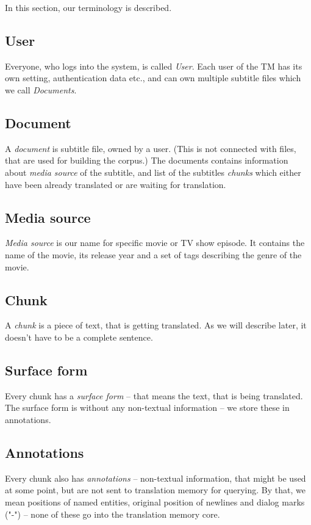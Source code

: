 \label{sec:glossary}

In this section, our terminology is described.

\subsection*{User}
Everyone, who logs into the system, is called \emph{User}. Each user of the TM has its own setting, authentication data etc., and can own multiple subtitle files which we call \emph{Documents}.

\subsection*{Document}
A \emph{document} is subtitle file, owned by a user. (This is not connected with files, that are used for building the corpus.) The documents contains information about \emph{media source} of the subtitle, and list of the subtitles \emph{chunks} which either have been already translated or are waiting for translation.

\subsection*{Media source}
\emph{Media source} is our name for specific movie or TV show episode. It contains the name of the movie, its release year and a set of tags describing the genre of the movie.

\subsection*{Chunk}
A \emph{chunk} is a piece of text, that is getting translated. As we will describe later, it doesn't have to be a complete sentence.

\subsection*{Surface form}
Every chunk has a \emph{surface form} -- that means the text, that is being translated. The surface form is without any non-textual information -- we store these in annotations.

\subsection*{Annotations}
Every chunk also has \emph{annotations} -- non-textual information, that might be used at some point, but are not sent to translation memory for querying. By that, we mean positions of named entities, original position of newlines and dialog marks ("-") -- none of these go into the translation memory core.

